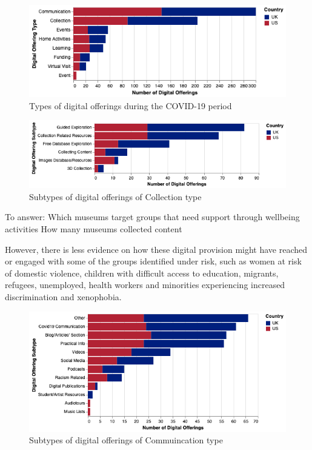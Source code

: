 \documentclass{egpubl}
\begin{document}
\begin{figure}[h]
  \centering
  \includegraphics[width=\linewidth]{images/digitalTypes.png}
  \caption{\label{fig:DigOffType}
           Types of digital offerings during the COVID-19 period}
\end{figure}
\begin{figure}[h]
  \centering
  \includegraphics[width=\linewidth]{images/collection.png}
  \caption{\label{fig:DigOffType}
           Subtypes of digital offerings of Collection type }
\end{figure}

\color{red}To answer:
Which museums target groups that need support through wellbeing activities
How many museums collected content 
\color{black}

However, there is less evidence on how these digital provision might have reached or engaged with some of the groups identified under risk, such as women at risk of domestic violence, children with difficult access to education, migrants, refugees, unemployed, health workers and minorities experiencing increased discrimination and xenophobia. 
\begin{figure}[h]
  \centering
  \includegraphics[width=\linewidth]{images/communication.png}
  \caption{\label{fig:DigOffType}
           Subtypes of digital offerings of Commuincation type}
\end{figure}
\end{document}
